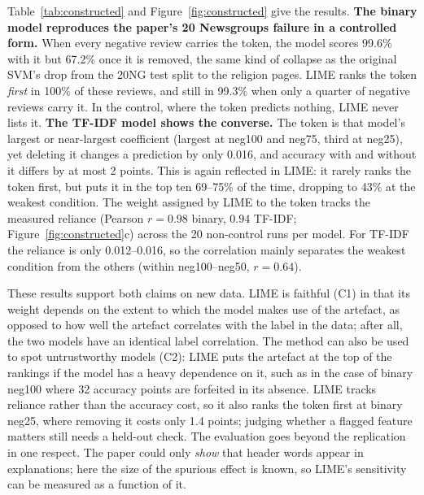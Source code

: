 Table~\ref{tab:constructed} and Figure~\ref{fig:constructed} give the results. \textbf{The binary model reproduces the paper's 20 Newsgroups failure in a controlled form.} When every negative review carries the token, the model scores 99.6\% with it but 67.2\% once it is removed, the same kind of collapse as the original SVM's drop from the 20NG test split to the religion pages. LIME ranks the token \emph{first} in 100\% of these reviews, and still in 99.3\% when only a quarter of negative reviews carry it. In the control, where the token predicts nothing, LIME never lists it. \textbf{The TF-IDF model shows the converse.} The token is that model's largest or near-largest coefficient (largest at neg100 and neg75, third at neg25), yet deleting it changes a prediction by only 0.016, and accuracy with and without it differs by at most 2 points. This is again reflected in LIME: it rarely ranks the token first, but puts it in the top ten 69--75\% of the time, dropping to 43\% at the weakest condition. The weight assigned by LIME to the token tracks the measured reliance (Pearson $r = 0.98$ binary, $0.94$ TF-IDF; Figure~\ref{fig:constructed}c) across the 20 non-control runs per model. For TF-IDF the reliance is only 0.012--0.016, so the correlation mainly separates the weakest condition from the others (within neg100--neg50, $r = 0.64$).

These results support both claims on new data. LIME is faithful (C1) in that its weight depends on the extent to which the model makes use of the artefact, as opposed to how well the artefact correlates with the label in the data; after all, the two models have an identical label correlation. The method can also be used to spot untrustworthy models (C2): LIME puts the artefact at the top of the rankings if the model has a heavy dependence on it, such as in the case of binary neg100 where 32 accuracy points are forfeited in its absence. LIME tracks reliance rather than the accuracy cost, so it also ranks the token first at binary neg25, where removing it costs only 1.4 points; judging whether a flagged feature matters still needs a held-out check. The evaluation goes beyond the replication in one respect. The paper could only \emph{show} that header words appear in explanations; here the size of the spurious effect is known, so LIME's sensitivity can be measured as a function of it.

